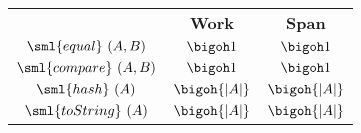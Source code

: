 \begin{costspec}[RealElt]

\begin{tabular}{c|c|c}
& \textbf{Work} & \textbf{Span} \\
$\sml{equal}~(A,B)$ & $\bigoh 1$ & $\bigoh 1$ \\
$\sml{compare}~(A,B)$ & $\bigoh 1$ & $\bigoh 1$ \\
$\sml{hash}~(A)$ & $\bigoh{|A|}$ & $\bigoh{|A|}$ \\
$\sml{toString}~(A)$ & $\bigoh{|A|}$ & $\bigoh{|A|}$ \\
\end{tabular}
\end{costspec}
